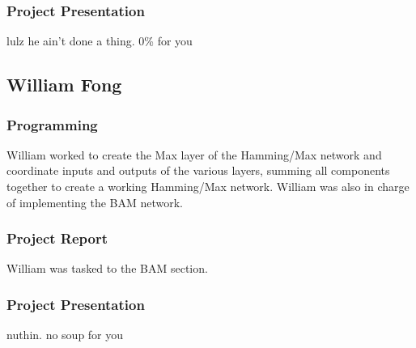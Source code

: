 \documentclass{article}
\begin{document}
\subsubsection{Project Presentation}
lulz he ain't done a thing.  0\% for you

\subsection{William Fong}
\subsubsection{Programming}
William worked to create the Max layer of the Hamming/Max network and coordinate 
inputs and outputs of the various layers, summing all components together to create a working Hamming/Max network. William was also in charge of implementing the BAM network.

\subsubsection{Project Report}
William was tasked to the BAM section.

\subsubsection{Project Presentation}
nuthin. no soup for you 
\end{document}
